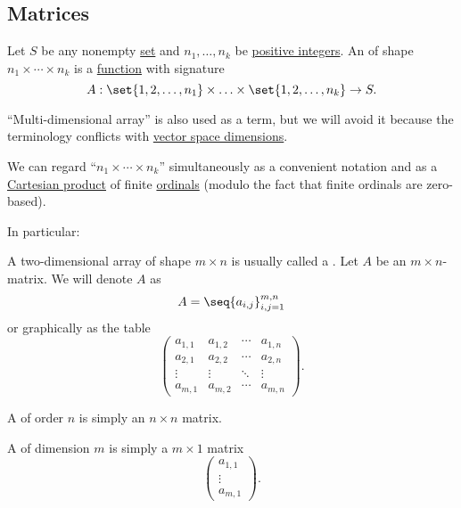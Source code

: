\subsection{Matrices}\label{subsec:matrices}

\begin{definition}\label{def:array}\mimprovised
  Let \( S \) be any nonempty \hyperref[def:set]{set} and \( n_1, \ldots, n_k \) be \hyperref[def:integer_signum]{positive integers}. An  of shape \( n_1 \times \cdots \times n_k \) is a \hyperref[def:function]{function} with signature
  \begin{equation*}
    A: \set{ 1, 2, \ldots, n_1 } \times \ldots \times \set{ 1, 2, \ldots, n_k } \to S.
  \end{equation*}

  \enquote{Multi-dimensional array} is also used as a term, but we will avoid it because the terminology conflicts with \hyperref[thm:vector_space_dimension]{vector space dimensions}.

  We can regard \enquote{\( n_1 \times \cdots \times n_k \)} simultaneously as a convenient notation and as a \hyperref[def:cartesian_product]{Cartesian product} of finite \hyperref[def:ordinal]{ordinals} (modulo the fact that finite ordinals are zero-based).

  In particular:
  \begin{thmenum}
     A two-dimensional array of shape \( m \times n \) is usually called a . Let \( A \) be an \( m \times n \)-matrix. We will denote \( A \) as
    \begin{equation*}
      A = \seq{ a_{i,j} }_{i,j=1}^{m,n}
    \end{equation*}
    or graphically as the table
    \begin{equation*}
      \begin{pmatrix}
        a_{1,1} & a_{1,2} & \cdots & a_{1,n} \\
        a_{2,1} & a_{2,2} & \cdots & a_{2,n} \\
        \vdots  & \vdots  & \ddots & \vdots  \\
        a_{m,1} & a_{m,2} & \cdots & a_{m,n}
      \end{pmatrix}.
    \end{equation*}

     A  of order \( n \) is simply an \( n \times n \) matrix.

     A  of dimension \( m \) is simply a \( m \times 1 \) matrix
    \begin{equation*}
      \begin{pmatrix}
        a_{1,1} \\
        \vdots  \\
        a_{m,1}
      \end{pmatrix}.
    \end{equation*}


\end{thmenum}
\end{definition}
